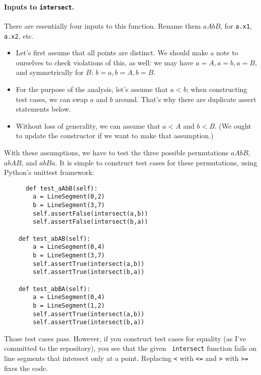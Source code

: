 \documentclass[11pt]{article}
\begin{document}
\paragraph{Inputs to {\tt intersect}.} There are essentially
four inputs to this function. Rename them $aAbB$, for {\tt a.x1},
{\tt a.x2}, etc.
\begin{itemize}
\item Let's first assume that all points are distinct. We should
  make a note to ourselves to check violations of this, as well:
  we may have $a = A, a = b, a = B$, and symmetrically for $B$:
  $b = a, b = A, b = B$.
  \item For the purpose of the analysis, let's assume that $a < b$;
    when constructing test cases, we can swap $a$ and $b$ around.
    That's why there are duplicate assert statements below.
  \item Without loss of generality, we can assume that
$a < A$ and $b < B$. (We ought to update the constructor if we
    want to make that assumption.) 
\end{itemize}
With these assumptions, we have to test the three possible permutations
$aAbB$, $abAB$, and $abBa$. It is simple to construct test cases
for these permutations, using Python's unittest framework:
\begin{lstlisting}
      def test_aAbB(self):
        a = LineSegment(0,2)
        b = LineSegment(3,7)
        self.assertFalse(intersect(a,b))
        self.assertFalse(intersect(b,a))

    def test_abAB(self):
        a = LineSegment(0,4)
        b = LineSegment(3,7)
        self.assertTrue(intersect(a,b))
        self.assertTrue(intersect(b,a))

    def test_abBA(self):
        a = LineSegment(0,4)
        b = LineSegment(1,2)
        self.assertTrue(intersect(a,b))
        self.assertTrue(intersect(b,a))
\end{lstlisting}
Those test cases pass. However, if you construct test cases for
equality (as I've committed to the repository), you see that the given {\tt
  intersect} function fails on line segments that intersect only at a
point. Replacing \verb+<+ with \verb+<=+ and \verb+>+ with \verb+>=+
fixes the code.
\end{document}
